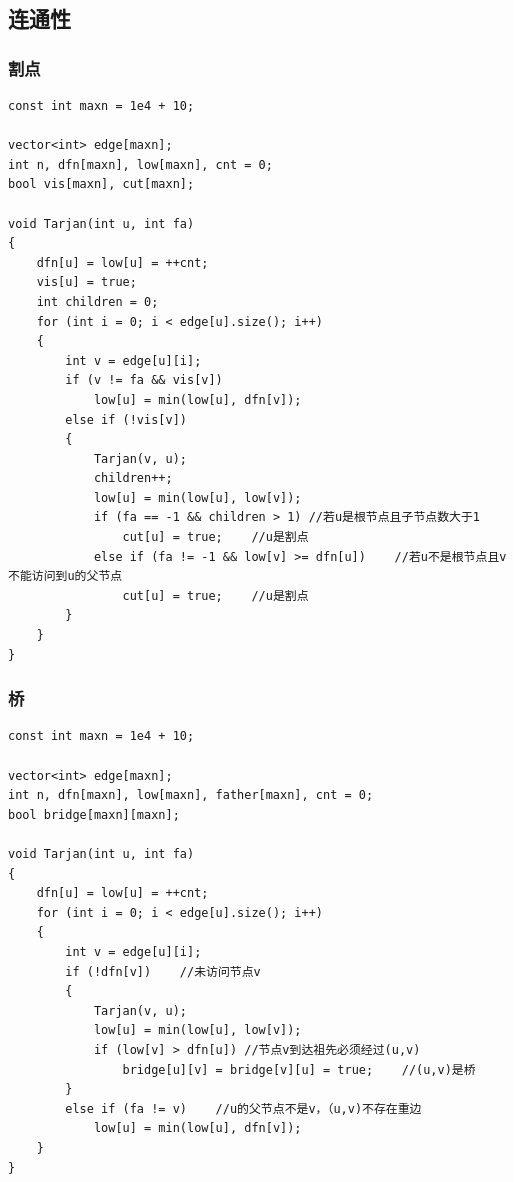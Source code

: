 \documentclass[twoside]{article}
\begin{document}
\subsection{连通性}
\subsubsection{割点}
\begin{lstlisting}
const int maxn = 1e4 + 10;

vector<int> edge[maxn];
int n, dfn[maxn], low[maxn], cnt = 0;
bool vis[maxn], cut[maxn];

void Tarjan(int u, int fa)
{
    dfn[u] = low[u] = ++cnt;
    vis[u] = true;
    int children = 0;
    for (int i = 0; i < edge[u].size(); i++)
    {
        int v = edge[u][i];
        if (v != fa && vis[v])
            low[u] = min(low[u], dfn[v]);
        else if (!vis[v])
        {
            Tarjan(v, u);
            children++;
            low[u] = min(low[u], low[v]);
            if (fa == -1 && children > 1) //若u是根节点且子节点数大于1
                cut[u] = true;    //u是割点
            else if (fa != -1 && low[v] >= dfn[u])    //若u不是根节点且v不能访问到u的父节点
                cut[u] = true;    //u是割点
        }
    }
}\end{lstlisting}
\subsubsection{桥}
\begin{lstlisting}
const int maxn = 1e4 + 10;

vector<int> edge[maxn];
int n, dfn[maxn], low[maxn], father[maxn], cnt = 0;
bool bridge[maxn][maxn];

void Tarjan(int u, int fa)
{
    dfn[u] = low[u] = ++cnt;
    for (int i = 0; i < edge[u].size(); i++)
    {
        int v = edge[u][i];
        if (!dfn[v])    //未访问节点v
        {
            Tarjan(v, u);
            low[u] = min(low[u], low[v]);
            if (low[v] > dfn[u]) //节点v到达祖先必须经过(u,v)
                bridge[u][v] = bridge[v][u] = true;    //(u,v)是桥
        } 
        else if (fa != v)    //u的父节点不是v，（u,v)不存在重边
            low[u] = min(low[u], dfn[v]);
    }
}\end{lstlisting}
\end{document}
